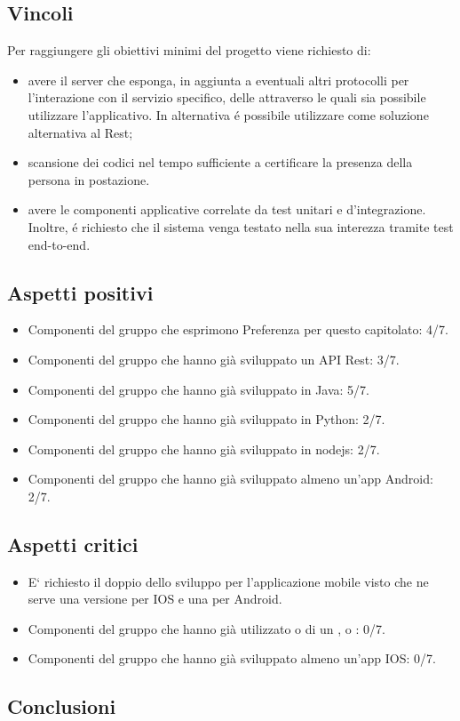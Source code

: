 \subsection{Vincoli}
Per raggiungere gli obiettivi minimi del progetto viene richiesto di:

\begin{itemize}
\item avere il server che esponga, in aggiunta a eventuali altri protocolli per l’interazione con il servizio specifico, delle  attraverso le quali sia possibile utilizzare l'applicativo. In alternativa \'e possibile utilizzare  come soluzione alternativa al Rest;
\item scansione dei codici nel tempo sufficiente a certificare la presenza della persona in postazione. 
\item avere le componenti applicative correlate da test unitari e d’integrazione. Inoltre, \'e richiesto che il sistema venga testato nella sua interezza tramite test end-to-end.
\end{itemize}

\subsection{Aspetti positivi}
\begin{itemize} 
\item Componenti del gruppo che esprimono Preferenza per questo capitolato: 4/7.
\item Componenti del gruppo che hanno già sviluppato un API Rest: 3/7.
\item Componenti del gruppo che hanno già sviluppato in Java: 5/7. 
\item Componenti del gruppo che hanno già sviluppato in Python: 2/7.
\item Componenti del gruppo che hanno già sviluppato in nodejs: 2/7.
\item Componenti del gruppo che hanno già sviluppato almeno un'app Android: 2/7.
\end{itemize}

\subsection{Aspetti critici}
\begin{itemize}
\item E` richiesto il doppio dello sviluppo per l'applicazione mobile visto che ne serve una versione per IOS e una per Android.
\item Componenti del gruppo che hanno già utilizzato  o di un ,  o : 0/7.
\item Componenti del gruppo che hanno già sviluppato almeno un'app IOS: 0/7.
\end{itemize}

\subsection{Conclusioni}
